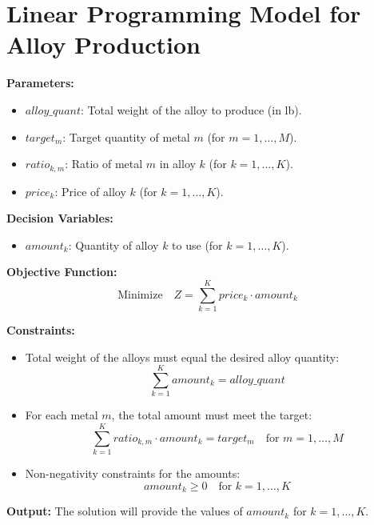 \documentclass{article}
\begin{document}
\section*{Linear Programming Model for Alloy Production}

\textbf{Parameters:}
\begin{itemize}
    \item \( alloy\_quant \): Total weight of the alloy to produce (in lb).
    \item \( target_{m} \): Target quantity of metal \( m \) (for \( m = 1, \ldots, M \)).
    \item \( ratio_{k, m} \): Ratio of metal \( m \) in alloy \( k \) (for \( k = 1, \ldots, K \)).
    \item \( price_{k} \): Price of alloy \( k \) (for \( k = 1, \ldots, K \)).
\end{itemize}

\textbf{Decision Variables:}
\begin{itemize}
    \item \( amount_{k} \): Quantity of alloy \( k \) to use (for \( k = 1, \ldots, K \)).
\end{itemize}

\textbf{Objective Function:}
\[
\text{Minimize} \quad Z = \sum_{k=1}^{K} price_{k} \cdot amount_{k}
\]

\textbf{Constraints:}
\begin{itemize}
    \item Total weight of the alloys must equal the desired alloy quantity:
    \[
    \sum_{k=1}^{K} amount_{k} = alloy\_quant
    \]
    
    \item For each metal \( m \), the total amount must meet the target:
    \[
    \sum_{k=1}^{K} ratio_{k, m} \cdot amount_{k} = target_{m} \quad \text{for } m = 1, \ldots, M
    \]

    \item Non-negativity constraints for the amounts:
    \[
    amount_{k} \geq 0 \quad \text{for } k = 1, \ldots, K
    \]
\end{itemize}

\textbf{Output:}
The solution will provide the values of \( amount_{k} \) for \( k = 1, \ldots, K \).
\end{document}
